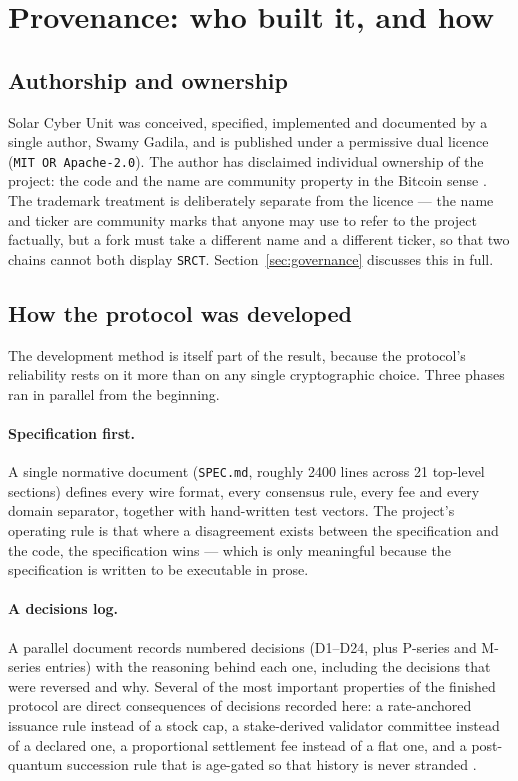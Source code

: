 \documentclass{article}
\begin{document}
\section{Provenance: who built it, and how}
\label{sec:provenance}

\subsection{Authorship and ownership}

Solar Cyber Unit was conceived, specified, implemented and documented by a single author,
Swamy Gadila, and is published under a permissive dual licence
(\texttt{MIT OR Apache-2.0}). The author has disclaimed individual ownership of
the project: the code and the name are community property in the Bitcoin sense
\cite{srct-repo,srct-readiness}. The trademark treatment is deliberately
separate from the licence --- the name and ticker are community marks that
anyone may use to refer to the project factually, but a fork must take a
different name and a different ticker, so that two chains cannot both display
\texttt{SRCT}. Section~\ref{sec:governance} discusses this in full.

\subsection{How the protocol was developed}

The development method is itself part of the result, because the protocol's
reliability rests on it more than on any single cryptographic choice. Three
phases ran in parallel from the beginning.

\paragraph{Specification first.} A single normative document (\texttt{SPEC.md},
roughly 2400 lines across 21 top-level sections) defines every wire format,
every consensus rule, every fee and every domain separator, together with
hand-written test vectors. The project's operating rule is that where a
disagreement exists between the specification and the code, the specification
wins --- which is only meaningful because the specification is written to be
executable in prose.

\paragraph{A decisions log.} A parallel document records numbered decisions
(D1--D24, plus P-series and M-series entries) with the reasoning behind each
one, including the decisions that were reversed and why. Several of the most
important properties of the finished protocol are direct consequences of
decisions recorded here: a rate-anchored issuance rule instead of a stock cap,
a stake-derived validator committee instead of a declared one, a proportional
settlement fee instead of a flat one, and a post-quantum succession rule that
is age-gated so that history is never stranded \cite{srct-decisions}.
\end{document}
